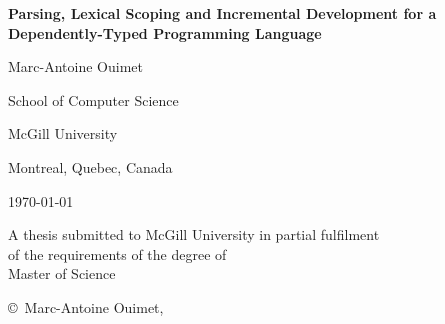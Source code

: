 \begin{titlepage}
\centering

\vspace*{0.5cm}

{\bfseries\LARGE Parsing, Lexical Scoping and Incremental Development for a Dependently-Typed Programming Language}

\vspace{1.8cm}

{\large Marc-Antoine Ouimet}

\vspace{2cm}

School of Computer Science

McGill University

Montreal, Quebec, Canada

\vspace{1.5cm}

\monthyeardate\today

\vspace{2cm}

A thesis submitted to McGill University in partial fulfilment\\
of the requirements of the degree of\\
Master of Science

\vfill

\copyright\ Marc-Antoine Ouimet, \the\year
\end{titlepage}
